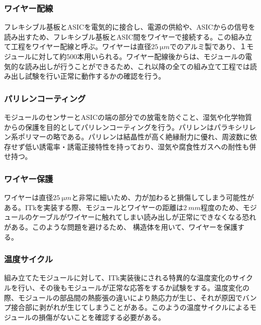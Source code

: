 \subsubsection*{ワイヤー配線}

フレキシブル基板とASICを電気的に接合し、電源の供給や、ASICからの信号を読み出すため、フレキシブル基板とASIC間をワイヤーで接続する。この組み立て工程をワイヤー配線と呼ぶ。ワイヤーは直径$25\ \si{\micro m}$でのアルミ製であり、１モジュールに対して約$500$本用いられる。ワイヤー配線後からは、モジュールの電気的な読み出しが行うことができるため、これ以降の全ての組み立て工程では読み出し試験を行い正常に動作するかの確認を行う。

\subsubsection*{パリレンコーティング}

モジュールのセンサーとASICの端の部分での放電を防ぐこと、湿気や化学物質からの保護を目的としてパリレンコーティングを行う。パリレンはパラキシリレン系ポリマーの略である。パリレンは結晶性が高く絶縁耐力に優れ、周波数に依存せず低い誘電率・誘電正接特性を持っており、湿気や腐食性ガスへの耐性も併せ持つ。


\subsubsection*{ワイヤー保護}

ワイヤーは直径$25\ \si{\micro m}$と非常に細いため、力が加わると損傷してしまう可能性がある。ITkを実装する際、モジュールとワイヤーの距離は$2\ \si{mm}$程度のため、モジュールのケーブルがワイヤーに触れてしまい読み出しが正常にできなくなる恐れがある。このような問題を避けるため、%
構造体を用いて、ワイヤーを保護する。


\subsubsection*{温度サイクル}

組み立てたモジュールに対して、ITk実装後にされる特異的な温度変化のサイクルを行い、その後もモジュールが正常な応答をするか試験をする。温度変化の際、モジュールの部品間の熱膨張の違いにより熱応力が生じ、それが原因でバンプ接合部に剥がれが生じてしまうことがある。このようの温度サイクルによるモジュールの損傷がないことを確認する必要がある。

